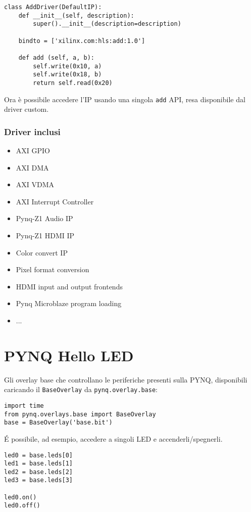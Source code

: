 \begin{verbatim}
class AddDriver(DefaultIP):
    def __init__(self, description):
        super().__init__(description=description)

    bindto = ['xilinx.com:hls:add:1.0']

    def add (self, a, b):
        self.write(0x10, a)
        self.write(0x18, b)
        return self.read(0x20)
\end{verbatim}

Ora è possibile accedere l'IP usando una singola \texttt{add} API, resa disponibile dal driver custom.

\subsubsection{Driver inclusi}
\begin{itemize}
    \item AXI GPIO
    \item AXI DMA
    \item AXI VDMA
    \item AXI Interrupt Controller
    \item Pynq-Z1 Audio IP
    \item Pynq-Z1 HDMI IP
    \item Color convert IP
    \item Pixel format conversion
    \item HDMI input and output frontends
    \item Pynq Microblaze program loading
    \item ...
\end{itemize}

\section{PYNQ Hello LED}
Gli overlay base che controllano le periferiche presenti sulla PYNQ, disponibili caricando il \texttt{BaseOverlay} da \texttt{pynq.overlay.base}:
\begin{verbatim}
import time
from pynq.overlays.base import BaseOverlay
base = BaseOverlay('base.bit')
\end{verbatim}

É possibile, ad esempio, accedere a singoli LED e accenderli/spegnerli.
\begin{verbatim}
led0 = base.leds[0]
led1 = base.leds[1]
led2 = base.leds[2]
led3 = base.leds[3]

led0.on()
led0.off()
\end{verbatim}


